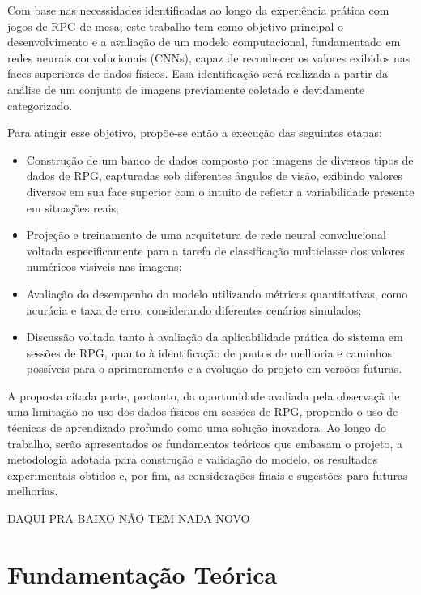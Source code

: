Com base nas necessidades identificadas ao longo da experiência prática com jogos de RPG de mesa, este trabalho 
tem como objetivo principal o desenvolvimento e a avaliação de um modelo computacional, fundamentado em redes 
neurais convolucionais (CNNs), capaz de reconhecer os valores exibidos nas faces superiores de dados físicos. 
Essa identificação será realizada a partir da análise de um conjunto de imagens previamente coletado e 
devidamente categorizado.

Para atingir esse objetivo, propõe-se então a execução das seguintes etapas:

\begin{itemize}
\item Construção de um banco de dados composto por imagens de diversos tipos de dados de RPG, capturadas sob 
diferentes ângulos de visão, exibindo valores diversos em sua face superior com o intuito de refletir a 
variabilidade presente em situações reais;
\item Projeção e treinamento de uma arquitetura de rede neural convolucional voltada especificamente para a 
tarefa de classificação multiclasse dos valores numéricos visíveis nas imagens;
\item  Avaliação do desempenho do modelo utilizando métricas quantitativas, como acurácia e taxa de erro, 
considerando diferentes cenários simulados;
\item Discussão voltada tanto à avaliação da aplicabilidade prática do sistema em sessões de RPG, quanto à 
identificação de pontos de melhoria e caminhos possíveis para o aprimoramento e a evolução do projeto em 
versões futuras.
\end{itemize}

A proposta citada parte, portanto, da oportunidade avaliada pela observaçã de uma limitação no uso dos dados físicos 
em sessões de RPG, propondo o uso de técnicas de aprendizado profundo como uma solução inovadora. 
Ao longo do trabalho, serão apresentados os fundamentos teóricos que embasam o projeto, a metodologia adotada para 
construção e validação do modelo, os resultados experimentais obtidos e, por fim, as considerações finais e 
sugestões para futuras melhorias.


\vspace{1cm}
DAQUI PRA BAIXO NÃO TEM NADA NOVO


\section{Fundamentação Teórica}

